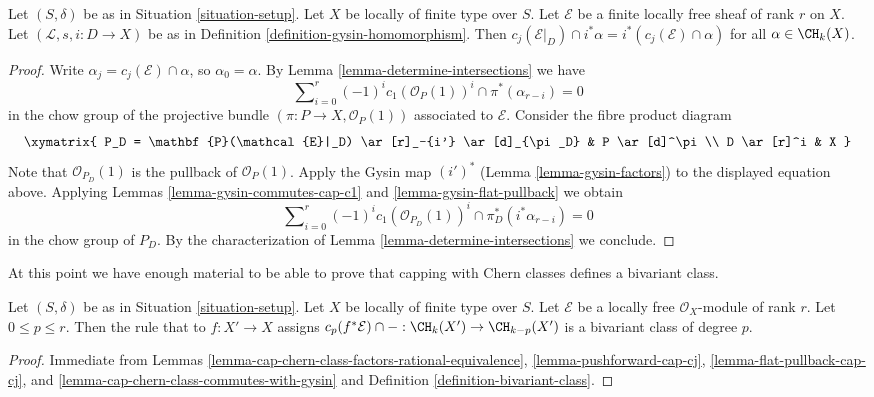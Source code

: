 \begin{lemma}
\label{lemma-cap-chern-class-commutes-with-gysin}
Let $(S, \delta)$ be as in Situation \ref{situation-setup}.
Let $X$ be locally of finite type over $S$.
Let $\mathcal{E}$ be a finite locally free sheaf of rank $r$ on $X$.
Let $(\mathcal{L}, s, i : D \to X)$ be as in
Definition \ref{definition-gysin-homomorphism}.
Then $c_j(\mathcal{E}|_D) \cap i^*\alpha = i^*(c_j(\mathcal{E}) \cap \alpha)$
for all $\alpha \in \CH_k(X)$.
\end{lemma}

\begin{proof}
Write $\alpha_j = c_j(\mathcal{E}) \cap \alpha$, so $\alpha_0 = \alpha$.
By Lemma \ref{lemma-determine-intersections} we have
$$
\sum\nolimits_{i = 0}^r
(-1)^i c_1(\mathcal{O}_P(1))^i \cap
\pi^*(\alpha_{r - i}) = 0
$$
in the chow group of the projective bundle
$(\pi : P \to X, \mathcal{O}_P(1))$
associated to $\mathcal{E}$. Consider the fibre product diagram
$$
\xymatrix{
P_D = \mathbf{P}(\mathcal{E}|_D) \ar[r]_-{i'} \ar[d]_{\pi_D} &
P \ar[d]^\pi \\
D \ar[r]^i & X
}
$$
Note that $\mathcal{O}_{P_D}(1)$ is the pullback of $\mathcal{O}_P(1)$.
Apply the Gysin map $(i')^*$ (Lemma \ref{lemma-gysin-factors}) to the
displayed equation above.
Applying Lemmas \ref{lemma-gysin-commutes-cap-c1} and
\ref{lemma-gysin-flat-pullback} we obtain
$$
\sum\nolimits_{i = 0}^r
(-1)^i c_1(\mathcal{O}_{P_D}(1))^i \cap
\pi_D^*(i^*\alpha_{r - i}) = 0
$$
in the chow group of $P_D$.
By the characterization of Lemma \ref{lemma-determine-intersections}
we conclude.
\end{proof}

\noindent
At this point we have enough material to be able to prove that
capping with Chern classes defines a bivariant class.

\begin{lemma}
\label{lemma-cap-cp-bivariant}
Let $(S, \delta)$ be as in Situation \ref{situation-setup}.
Let $X$ be locally of finite type over $S$.
Let $\mathcal{E}$ be a locally free $\mathcal{O}_X$-module
of rank $r$. Let $0 \leq p \leq r$.
Then the rule that to $f : X' \to X$ assigns
$c_p(f^*\mathcal{E}) \cap - : \CH_k(X') \to \CH_{k - p}(X')$
is a bivariant class of degree $p$.
\end{lemma}

\begin{proof}
Immediate from Lemmas
\ref{lemma-cap-chern-class-factors-rational-equivalence},
\ref{lemma-pushforward-cap-cj},
\ref{lemma-flat-pullback-cap-cj}, and
\ref{lemma-cap-chern-class-commutes-with-gysin}
and Definition \ref{definition-bivariant-class}.
\end{proof}

